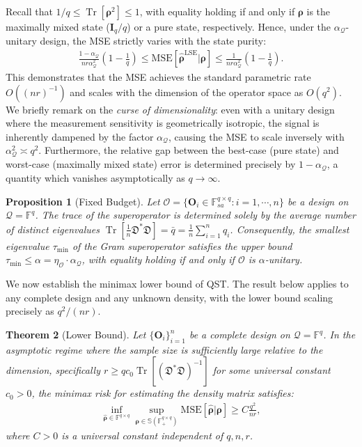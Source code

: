 \documentclass[noinfoline]{imsart}\setcounter{tocdepth}{2}
\renewcommand{\b}[1]{\mathbb{#1}} %
\newcommand{\m}[1]{\mathbf{#1}} %
\newcommand{\s}[1]{\mathscr{#1}} %
\newcommand{\f}[1]{\mathfrak{#1}} %
\renewcommand{\c}[1]{\mathcal{#1}} %
\newcommand{\mb}[1]{\boldsymbol{#1}} %
\newcommand{\tr}[1]{\operatorname{Tr}\left[#1\right]}
\theoremstyle{plain}
\newtheorem{theorem}{Theorem}[section]
\newtheorem{proposition}[theorem]{Proposition}
\begin{document}
Recall that $1/q \le \tr{\mb{\rho}^{2}} \le 1$, with equality holding if and only if $\mb{\rho}$ is the maximally mixed state ($\m{I}_{q}/q$) or a pure state, respectively. Hence, under the $\alpha_{\c{Q}}$-unitary design, the MSE strictly varies with the state purity:
\begin{align*}
    \frac{1-\alpha_{\c{Q}}}{n r \alpha_{\c{Q}}^{2}} \left(1 - \frac{1}{q} \right) \le \mathrm{MSE}[\hat{\mb{\rho}}^{\text{LSE}} \vert \mb{\rho}] \le \frac{1}{n r \alpha_{\c{Q}}^{2}} \left(1 - \frac{1}{q} \right).
\end{align*}  
This demonstrates that the MSE achieves the standard parametric rate $O((nr)^{-1})$ and scales with the dimension of the operator space as $O(q^{2})$. 
We briefly remark on the \emph{curse of dimensionality}: even with a unitary design where the measurement sensitivity is geometrically isotropic, the signal is inherently dampened by the factor $\alpha_{\c{Q}}$, causing the MSE to scale inversely with $\alpha_{\c{Q}}^{2} \asymp q^{2}$. Furthermore, the relative gap between the best-case (pure state) and worst-case (maximally mixed state) error is determined precisely by $1 - \alpha_{\c{Q}}$, a quantity which vanishes asymptotically as $q \to \infty$.


\begin{proposition}[Fixed Budget]\label{prop:fixed:bud}
Let $\s{O} = \{\m{O}_{i} \in \b{F}_{sa}^{q \times q}: i = 1, \cdots, n\}$ be a design on $\c{Q} = \b{F}^{q}$. The trace of the superoperator is determined solely by the average number of distinct eigenvalues $\tr{\tfrac{1}{n}\f{D}^{*} \f{D}} = \bar{q} = \tfrac{1}{n} \sum_{i=1}^{n} q_{i}$.
Consequently, the smallest eigenvalue $\tau_{\min}$ of the Gram superoperator satisfies the upper bound $\tau_{\min} \le \alpha = \eta_{\s{O}} \cdot \alpha_{\c{Q}}$, with equality holding if and only if $\s{O}$ is $\alpha$-unitary. 
\end{proposition}


We now establish the minimax lower bound of QST. The result below applies to any complete design and any unknown density, with the lower bound scaling precisely as $q^{2}/(nr)$. 

\begin{theorem}[Lower Bound]\label{thm:minimax}
Let $\{\m{O}_{i}\}_{i=1}^{n}$ be a complete design on $\c{Q} = \b{F}^{q}$. In the asymptotic regime where the sample size is sufficiently large relative to the dimension, specifically $r \ge q c_{0} \tr{(\f{D}^{*} \f{D} )^{-1}}$ for some universal constant $c_{0} > 0$, the minimax risk for estimating the density matrix satisfies:
\begin{align*}
    \inf_{\hat{\mb{\rho}} \in \b{F}^{q \times q}} \sup_{\mb{\rho} \in \b{S}(\b{F}_{+}^{q \times q})} \mathrm{MSE}[\hat{\mb{\rho}} \vert \mb{\rho}] \ge C \frac{q^{2}}{nr},
\end{align*}
where $C > 0$ is a universal constant independent of $q, n, r$.
\end{theorem}
\end{document}
